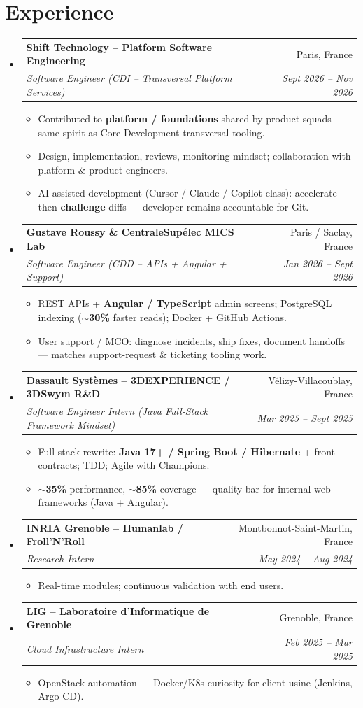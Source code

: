 \documentclass[letterpaper,10.5pt]{article}
\makeatletter
\newcommand{\resumeItem}[1]{\item\small{#1 \vspace{-1.5pt}}}
\newcommand{\resumeSubheading}[4]{\vspace{-1pt}\item\begin{tabular*}{0.97\textwidth}[t]{l@{\extracolsep{\fill}}r}\textbf{#1} & #2 \\\textit{\small#3} & \textit{\small #4} \\\end{tabular*}\vspace{-5pt}}
\newcommand{\resumeSubHeadingListStart}{\begin{itemize}[leftmargin=0.15in, label={}]}
\newcommand{\resumeSubHeadingListEnd}{\end{itemize}}
\newcommand{\resumeItemListStart}{\begin{itemize}[leftmargin=0.18in]}
\newcommand{\resumeItemListEnd}{\end{itemize}\vspace{-3pt}}
\makeatother
\begin{document}
\section{Experience}
\resumeSubHeadingListStart
  \resumeSubheading
    {Shift Technology -- Platform Software Engineering}{Paris, France}
    {Software Engineer (CDI -- Transversal Platform Services)}{Sept 2026 -- Nov 2026}
    \resumeItemListStart
      \resumeItem{Contributed to \textbf{platform / foundations} shared by product squads --- same spirit as Core Development transversal tooling.}
      \resumeItem{Design, implementation, reviews, monitoring mindset; collaboration with platform \& product engineers.}
      \resumeItem{AI-assisted development (Cursor / Claude / Copilot-class): accelerate then \textbf{challenge} diffs --- developer remains accountable for Git.}
    \resumeItemListEnd
  \resumeSubheading
    {Gustave Roussy \& CentraleSup\'elec MICS Lab}{Paris / Saclay, France}
    {Software Engineer (CDD -- APIs + Angular + Support)}{Jan 2026 -- Sept 2026}
    \resumeItemListStart
      \resumeItem{REST APIs + \textbf{Angular / TypeScript} admin screens; PostgreSQL indexing (\textbf{$\sim$30\%} faster reads); Docker + GitHub Actions.}
      \resumeItem{User support / MCO: diagnose incidents, ship fixes, document handoffs --- matches support-request \& ticketing tooling work.}
    \resumeItemListEnd
  \resumeSubheading
    {Dassault Syst\`emes -- 3DEXPERIENCE / 3DSwym R\&D}{V\'elizy-Villacoublay, France}
    {Software Engineer Intern (Java Full-Stack Framework Mindset)}{Mar 2025 -- Sept 2025}
    \resumeItemListStart
      \resumeItem{Full-stack rewrite: \textbf{Java 17+ / Spring Boot / Hibernate} + front contracts; TDD; Agile with Champions.}
      \resumeItem{\textbf{$\sim$35\%} performance, \textbf{$\sim$85\%} coverage --- quality bar for internal web frameworks (Java + Angular).}
    \resumeItemListEnd
  \resumeSubheading
    {INRIA Grenoble -- Humanlab / Froll'N'Roll}{Montbonnot-Saint-Martin, France}
    {Research Intern}{May 2024 -- Aug 2024}
    \resumeItemListStart
      \resumeItem{Real-time modules; continuous validation with end users.}
    \resumeItemListEnd
  \resumeSubheading
    {LIG -- Laboratoire d'Informatique de Grenoble}{Grenoble, France}
    {Cloud Infrastructure Intern}{Feb 2025 -- Mar 2025}
    \resumeItemListStart
      \resumeItem{OpenStack automation --- Docker/K8s curiosity for client usine (Jenkins, Argo CD).}
    \resumeItemListEnd
\resumeSubHeadingListEnd
\end{document}
